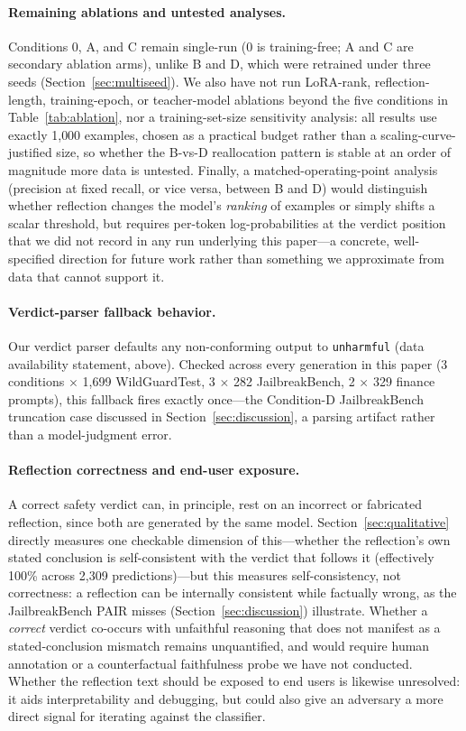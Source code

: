 \documentclass[Superintelligence,article,submit,pdftex,moreauthors]{Definitions/mdpi}
\begin{document}
\paragraph{Remaining ablations and untested analyses.}
Conditions 0, A, and C remain single-run (0 is training-free; A and C are secondary ablation arms), unlike B and D, which were retrained under three seeds (Section~\ref{sec:multiseed}). We also have not run LoRA-rank, reflection-length, training-epoch, or teacher-model ablations beyond the five conditions in Table~\ref{tab:ablation}, nor a training-set-size sensitivity analysis: all results use exactly 1{,}000 examples, chosen as a practical budget rather than a scaling-curve-justified size, so whether the B-vs-D reallocation pattern is stable at an order of magnitude more data is untested. Finally, a matched-operating-point analysis (precision at fixed recall, or vice versa, between B and D) would distinguish whether reflection changes the model's \emph{ranking} of examples or simply shifts a scalar threshold, but requires per-token log-probabilities at the verdict position that we did not record in any run underlying this paper---a concrete, well-specified direction for future work rather than something we approximate from data that cannot support it.

\paragraph{Verdict-parser fallback behavior.}
Our verdict parser defaults any non-conforming output to \texttt{unharmful} (data availability statement, above). Checked across every generation in this paper (3 conditions $\times$ 1{,}699 WildGuardTest, 3 $\times$ 282 JailbreakBench, 2 $\times$ 329 finance prompts), this fallback fires exactly once---the Condition-D JailbreakBench truncation case discussed in Section~\ref{sec:discussion}, a parsing artifact rather than a model-judgment error.

\paragraph{Reflection correctness and end-user exposure.}
A correct safety verdict can, in principle, rest on an incorrect or fabricated reflection, since both are generated by the same model. Section~\ref{sec:qualitative} directly measures one checkable dimension of this---whether the reflection's own stated conclusion is self-consistent with the verdict that follows it (effectively 100\% across 2{,}309 predictions)---but this measures self-consistency, not correctness: a reflection can be internally consistent while factually wrong, as the JailbreakBench PAIR misses (Section~\ref{sec:discussion}) illustrate. Whether a \emph{correct} verdict co-occurs with unfaithful reasoning that does not manifest as a stated-conclusion mismatch remains unquantified, and would require human annotation or a counterfactual faithfulness probe we have not conducted. Whether the reflection text should be exposed to end users is likewise unresolved: it aids interpretability and debugging, but could also give an adversary a more direct signal for iterating against the classifier.
\end{document}
